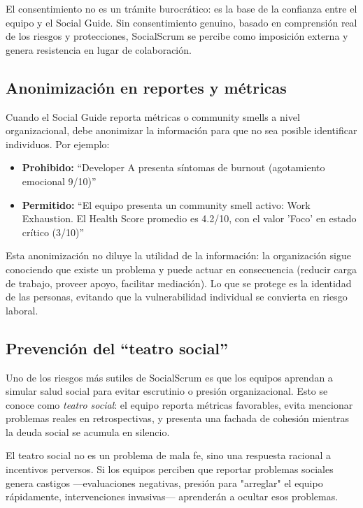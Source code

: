 El consentimiento no es un trámite burocrático: es la base de la confianza entre el equipo y el Social Guide. Sin consentimiento genuino, basado en comprensión real de los riesgos y protecciones, SocialScrum se percibe como imposición externa y genera resistencia en lugar de colaboración.

\subsection{Anonimización en reportes y métricas}

Cuando el Social Guide reporta métricas o community smells a nivel organizacional, debe anonimizar la información para que no sea posible identificar individuos. Por ejemplo:

\begin{itemize}
    \item \textbf{Prohibido:} ``Developer A presenta síntomas de burnout (agotamiento emocional 9/10)''
    \item \textbf{Permitido:} ``El equipo presenta un community smell activo: Work Exhaustion. El Health Score promedio es 4.2/10, con el valor 'Foco' en estado crítico (3/10)''
\end{itemize}

Esta anonimización no diluye la utilidad de la información: la organización sigue conociendo que existe un problema y puede actuar en consecuencia (reducir carga de trabajo, proveer apoyo, facilitar mediación). Lo que se protege es la identidad de las personas, evitando que la vulnerabilidad individual se convierta en riesgo laboral.

\subsection{Prevención del ``teatro social''}

Uno de los riesgos más sutiles de SocialScrum es que los equipos aprendan a simular salud social para evitar escrutinio o presión organizacional. Esto se conoce como \textit{teatro social}: el equipo reporta métricas favorables, evita mencionar problemas reales en retrospectivas, y presenta una fachada de cohesión mientras la deuda social se acumula en silencio.

El teatro social no es un problema de mala fe, sino una respuesta racional a incentivos perversos. Si los equipos perciben que reportar problemas sociales genera castigos —evaluaciones negativas, presión para "arreglar" el equipo rápidamente, intervenciones invasivas— aprenderán a ocultar esos problemas.

